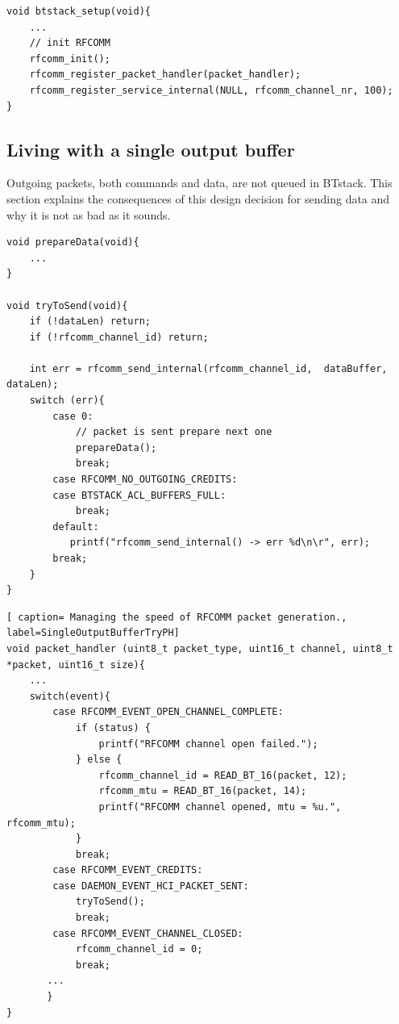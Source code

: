 \begin{lstlisting}[caption= RFCOMM service with automatic credit management. , label=automaticFlowControl]
void btstack_setup(void){
    ...
    // init RFCOMM
    rfcomm_init();
    rfcomm_register_packet_handler(packet_handler);
    rfcomm_register_service_internal(NULL, rfcomm_channel_nr, 100); 
}
\end{lstlisting}


\subsection{Living with a single output buffer}
\label{section:single_buffer}
Outgoing packets, both commands and data, are not queued in BTstack. This section explains the consequences of this design decision for sending data and why it is not as bad as it sounds.

\noindent\begin{minipage}{\textwidth}
\begin{lstlisting}[caption=Preparing and sending data., label=SingleOutputBufferTryToSend]
void prepareData(void){
    ...
}

void tryToSend(void){
    if (!dataLen) return;
    if (!rfcomm_channel_id) return;
    
    int err = rfcomm_send_internal(rfcomm_channel_id,  dataBuffer, dataLen);
    switch (err){
        case 0:
            // packet is sent prepare next one
            prepareData();
            break;
        case RFCOMM_NO_OUTGOING_CREDITS:
        case BTSTACK_ACL_BUFFERS_FULL:
            break;
        default:
           printf("rfcomm_send_internal() -> err %d\n\r", err);
        break;
    }
}
\end{lstlisting}
\begin{lstlisting}[ caption= Managing the speed of RFCOMM packet generation., label=SingleOutputBufferTryPH]
void packet_handler (uint8_t packet_type, uint16_t channel, uint8_t *packet, uint16_t size){
    ...
    switch(event){
        case RFCOMM_EVENT_OPEN_CHANNEL_COMPLETE:
            if (status) {
                printf("RFCOMM channel open failed.");
            } else {
                rfcomm_channel_id = READ_BT_16(packet, 12);
                rfcomm_mtu = READ_BT_16(packet, 14);
                printf("RFCOMM channel opened, mtu = %u.", rfcomm_mtu);
            }
            break;
        case RFCOMM_EVENT_CREDITS:
        case DAEMON_EVENT_HCI_PACKET_SENT:
            tryToSend();
            break;
        case RFCOMM_EVENT_CHANNEL_CLOSED:
            rfcomm_channel_id = 0;
            break;
       ...
       }
}
\end{lstlisting}
\end{minipage}


